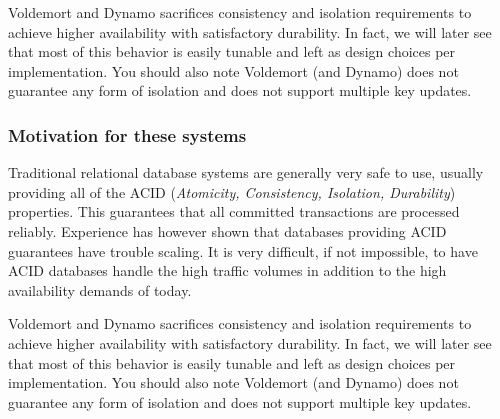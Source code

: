 Voldemort and Dynamo sacrifices consistency and isolation requirements to achieve higher availability with satisfactory durability.
In fact, we will later see that most of this behavior is easily tunable and left as design choices per implementation.
You should also note Voldemort (and Dynamo) does not guarantee any form of isolation and does not support multiple key updates.


\subsubsection{Motivation for these systems}
Traditional relational database systems are generally very safe to use, usually providing all of the ACID (\emph{Atomicity, Consistency, Isolation, Durability}) properties.
This guarantees that all committed transactions are processed reliably.
Experience has however shown that databases providing ACID guarantees have trouble scaling. It is very difficult, if not impossible, to have ACID databases handle the high traffic volumes in addition to the high availability demands of today.

Voldemort and Dynamo sacrifices consistency and isolation requirements to achieve higher availability with satisfactory durability.
In fact, we will later see that most of this behavior is easily tunable and left as design choices per implementation.
You should also note Voldemort (and Dynamo) does not guarantee any form of isolation and does not support multiple key updates.


